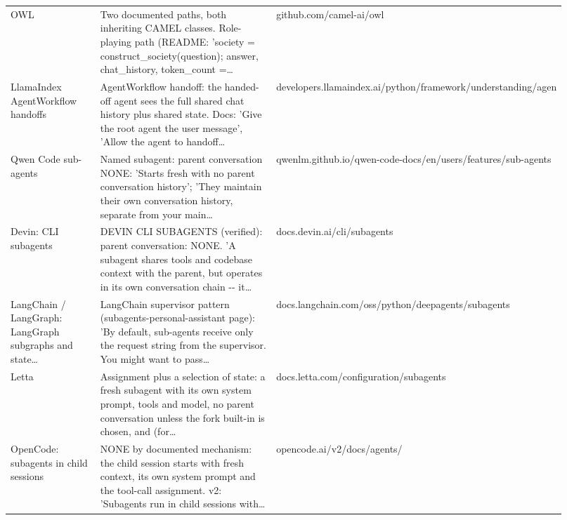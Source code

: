 \begin{longtable}{p{0.22\linewidth}p{0.5\linewidth}p{0.2\linewidth}}
OWL & Two documented paths, both inheriting CAMEL classes.\allowbreak{} Role-\allowbreak{}playing path (README: 'society = construct\_\allowbreak{}society(question); answer, chat\_\allowbreak{}history, token\_\allowbreak{}count =\ldots & github.\allowbreak{}com/\allowbreak{}camel-\allowbreak{}ai/\allowbreak{}owl \\
LlamaIndex AgentWorkflo\allowbreak{}w handoffs & AgentWorkflo\allowbreak{}w handoff: the handed-\allowbreak{}off agent sees the full shared chat history plus shared state.\allowbreak{} Docs: 'Give the root agent the user message', 'Allow the agent to handoff\ldots & developers.\allowbreak{}llamaindex.\allowbreak{}ai/\allowbreak{}python/\allowbreak{}framework/\allowbreak{}understandin\allowbreak{}g/\allowbreak{}agen \\
Qwen Code sub-\allowbreak{}agents & Named subagent: parent conversation NONE: 'Starts fresh with no parent conversation history'; 'They maintain their own conversation history, separate from your main\ldots & qwenlm.\allowbreak{}github.\allowbreak{}io/\allowbreak{}qwen-\allowbreak{}code-\allowbreak{}docs/\allowbreak{}en/\allowbreak{}users/\allowbreak{}features/\allowbreak{}sub-\allowbreak{}agents \\
Devin: CLI subagents & DEVIN CLI SUBAGENTS (verified): parent conversation: NONE.\allowbreak{} 'A subagent shares tools and codebase context with the parent, but operates in its own conversation chain -\allowbreak{}-\allowbreak{} it\ldots & docs.\allowbreak{}devin.\allowbreak{}ai/\allowbreak{}cli/\allowbreak{}subagents \\
LangChain /\allowbreak{} LangGraph: LangGraph subgraphs and state\ldots & LangChain supervisor pattern (subagents-\allowbreak{}personal-\allowbreak{}assistant page): 'By default, sub-\allowbreak{}agents receive only the request string from the supervisor.\allowbreak{} You might want to pass\ldots & docs.\allowbreak{}langchain.\allowbreak{}com/\allowbreak{}oss/\allowbreak{}python/\allowbreak{}deepagents/\allowbreak{}subagents \\
Letta & Assignment plus a selection of state: a fresh subagent with its own system prompt, tools and model, no parent conversation unless the fork built-\allowbreak{}in is chosen, and (for\ldots & docs.\allowbreak{}letta.\allowbreak{}com/\allowbreak{}configuratio\allowbreak{}n/\allowbreak{}subagents \\
OpenCode: subagents in child sessions & NONE by documented mechanism: the child session starts with fresh context, its own system prompt and the tool-\allowbreak{}call assignment.\allowbreak{} v2: 'Subagents run in child sessions with\ldots & opencode.\allowbreak{}ai/\allowbreak{}v2/\allowbreak{}docs/\allowbreak{}agents/\allowbreak{} \\

\end{longtable}
